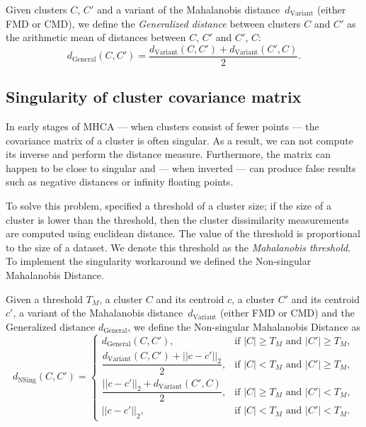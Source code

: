 \begin{defn}
	Given clusters $C$, $C'$ and a variant of the Mahalanobis distance~$d_\text{Variant}$ (either FMD or CMD), we define the \emph{Generalized distance} between clusters $C$ and $C'$ as the arithmetic mean of distances between $C$, $C'$ and $C'$, $C$:
	$$d_\text{General}(C,C') = \frac{d_\text{Variant}(C,C')+d_\text{Variant}(C',C)}{2}.$$
	\label{def01:gene}
\end{defn}  


\subsection{Singularity of cluster covariance matrix}

In early stages of MHCA --- when clusters consist of fewer points --- the covariance matrix of a cluster is often singular. As a result, we can not compute its inverse and perform the distance measure. Furthermore, the matrix can happen to be close to singular and --- when inverted --- can produce false results such as negative distances or infinity floating points.

To solve this problem, \citet{fivser2012detection} specified a threshold of a cluster size; if the size of a cluster is lower than the threshold, then the cluster dissimilarity measurements are computed using euclidean distance. The value of the threshold is proportional to the size of a dataset. We denote this threshold as the \emph{Mahalanobis threshold}. To implement the singularity workaround we defined the Non-singular Mahalanobis Distance.

\begin{defn}
	Given a threshold $T_M$, a cluster $C$ and its centroid $c$, a cluster $C'$ and its centroid $c'$, a variant of the Mahalanobis distance~$d_\text{Variant}$ (either FMD or CMD) and the Generalized distance $d_\text{General}$, we define the Non-singular Mahalanobis Distance as
	$$
	d_\text{NSing}(C,C')=
	\begin{cases}
		d_\text{General}(C, C'),                       & \text{if $|C|\ge T_M$ and $|C'|\ge T_M$}, \\
		\dfrac{d_\text{Variant}(C, C')+||c-c'||_2}{2}, & \text{if $|C| < T_M$ and $|C'|\ge T_M$},  \\
		\dfrac{||c-c'||_2+d_\text{Variant}(C', C)}{2}, & \text{if $|C|\ge T_M$ and $|C'|< T_M$},   \\
		||c-c'||_2,                                    & \text{if $|C|< T_M$ and $|C'|< T_M$}.
	\end{cases}
	$$
	\label{def01:alt}
\end{defn}

